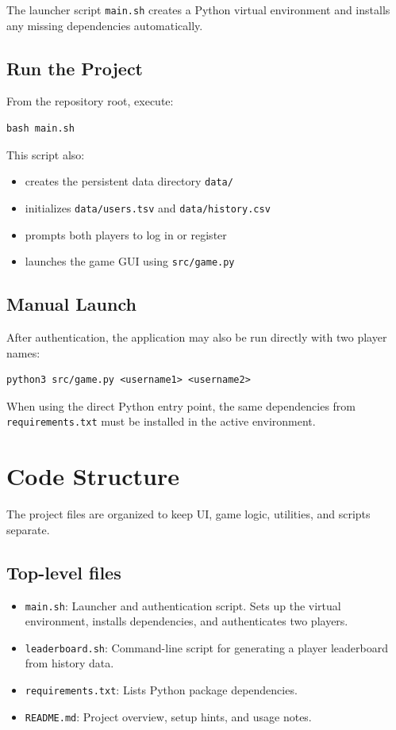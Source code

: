 \documentclass[12pt,a4paper]{article}
\begin{document}
The launcher script \texttt{main.sh} creates a Python virtual environment and installs any missing dependencies automatically.

\subsection{Run the Project}

From the repository root, execute:

\begin{verbatim}
bash main.sh
\end{verbatim}

This script also:

\begin{itemize}
    \item creates the persistent data directory \texttt{data/}
    \item initializes \texttt{data/users.tsv} and \texttt{data/history.csv}
    \item prompts both players to log in or register
    \item launches the game GUI using \texttt{src/game.py}
\end{itemize}

\subsection{Manual Launch}

After authentication, the application may also be run directly with two player names:

\begin{verbatim}
python3 src/game.py <username1> <username2>
\end{verbatim}

When using the direct Python entry point, the same dependencies from \texttt{requirements.txt} must be installed in the active environment.

\section{Code Structure}

The project files are organized to keep UI, game logic, utilities, and scripts separate.

\subsection{Top-level files}

\begin{itemize}
    \item \texttt{main.sh}: Launcher and authentication script. Sets up the virtual environment, installs dependencies, and authenticates two players.
    \item \texttt{leaderboard.sh}: Command-line script for generating a player leaderboard from history data.
    \item \texttt{requirements.txt}: Lists Python package dependencies.
    \item \texttt{README.md}: Project overview, setup hints, and usage notes.
\end{itemize}
\end{document}
